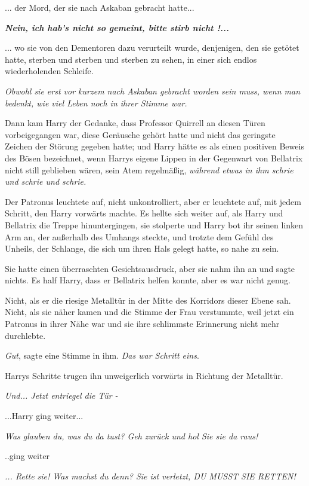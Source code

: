 ... der Mord, der sie nach Askaban gebracht hatte...

\textbf{\emph{\glqq{}Nein, ich hab's
nicht so gemeint, bitte stirb nicht !...\grqq{}} }

... wo sie von den Dementoren dazu verurteilt wurde, denjenigen, den sie getötet
hatte, sterben und sterben und sterben zu sehen, in einer sich endlos
wiederholenden Schleife.

\emph{Obwohl sie erst vor kurzem nach Askaban gebracht worden sein muss, wenn
man bedenkt, wie viel Leben noch in ihrer Stimme war.}

Dann kam Harry der Gedanke, dass Professor Quirrell an diesen Türen
vorbeigegangen war, diese Geräusche gehört hatte und nicht das geringste Zeichen
der Störung gegeben hatte; und Harry hätte es als einen positiven Beweis des
Bösen bezeichnet, wenn Harrys eigene Lippen in der Gegenwart von Bellatrix nicht
still geblieben wären, sein Atem regelmäßig, \emph{während etwas in ihm schrie
und schrie und schrie.}

Der Patronus leuchtete auf, nicht unkontrolliert, aber er leuchtete auf, mit
jedem Schritt, den Harry vorwärts machte. Es hellte sich weiter auf, als Harry
und Bellatrix die Treppe hinuntergingen, sie stolperte und Harry bot ihr seinen
linken Arm an, der außerhalb des Umhangs steckte, und trotzte dem Gefühl des
Unheils, der Schlange, die sich um ihren Hals gelegt hatte, so nahe zu sein.

Sie hatte einen überraschten Gesichtsausdruck, aber sie nahm ihn an und sagte
nichts. Es half Harry, dass er Bellatrix helfen konnte, aber es war nicht genug.

Nicht, als er die riesige Metalltür in der Mitte des Korridors dieser Ebene sah.
Nicht, als sie näher kamen und die Stimme der Frau verstummte, weil jetzt ein
Patronus in ihrer Nähe war und sie ihre schlimmste Erinnerung nicht mehr
durchlebte.

\emph{Gut}, sagte eine Stimme in ihm. \emph{Das war Schritt eins}.

Harrys Schritte trugen ihn unweigerlich vorwärts in Richtung der Metalltür.

\emph{Und... Jetzt entriegel die Tür -}

...Harry ging weiter...

\emph{Was glauben du, was du da tust? Geh zurück und hol Sie sie da raus!}

..ging weiter

\emph{... Rette sie! Was machst du denn? Sie ist verletzt, DU MUSST SIE RETTEN!}

